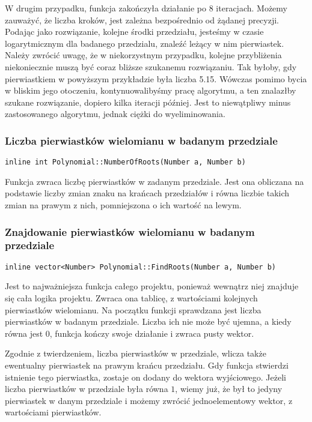 \documentclass[twoside,a4paper]{book}
\begin{document}
W drugim przypadku, funkcja zakończyła działanie po 8 iteracjach. Możemy zauważyć, że liczba kroków, jest zależna bezpośrednio od żądanej precyzji. Podając jako rozwiązanie, kolejne środki przedziału, jesteśmy w czasie logarytmicznym dla badanego przedzialu, znaleźć leżący w nim pierwiastek. Należy zwrócić uwagę, że w niekorzystnym przypadku, kolejne przybliżenia niekoniecznie muszą być coraz bliższe szukanemu rozwiązaniu. Tak byłoby, gdy pierwiastkiem w powyższym przykładzie była liczba 5.15. Wówczas pomimo bycia w bliskim jego otoczeniu, kontynuowalibyśmy pracę algorytmu, a ten znalazłby szukane rozwiązanie, dopiero kilka iteracji później. Jest to niewątpliwy minus zastosowanego algorytmu, jednak ciężki do wyeliminowania.
\\

\subsubsection{Liczba pierwiastków wielomianu w badanym przedziale}
\begin{lstlisting}
inline int Polynomial::NumberOfRoots(Number a, Number b)
\end{lstlisting}

Funkcja zwraca liczbę pierwiastków w zadanym przedziale. Jest ona obliczana na podstawie liczby zmian znaku na krańcach przedziałów i równa liczbie takich zmian na prawym z nich, pomniejszona o ich wartość na lewym.
\\

\subsubsection{Znajdowanie pierwiastków wielomianu w badanym przedziale}
\begin{lstlisting}
inline vector<Number> Polynomial::FindRoots(Number a, Number b)
\end{lstlisting}

Jest to najważniejsza funkcja całego projektu, ponieważ wewnątrz niej znajduje się cała logika projektu. Zwraca ona tablicę, z wartościami kolejnych pierwiastków wielomianu. Na początku funkcji sprawdzana jest liczba pierwiastków w badanym przedziale. Liczba ich nie może być ujemna, a kiedy równa jest $0$, funkcja kończy swoje działanie i zwraca pusty wektor.

Zgodnie z twierdzeniem, liczba pierwiastków w przedziale, wlicza także ewentualny pierwiastek na prawym krańcu przedziału. Gdy funkcja stwierdzi istnienie tego pierwiastka, zostaje on dodany do wektora wyjściowego. Jeżeli liczba pierwiastków w przedziale była równa $1$, wiemy już, że był to jedyny pierwiastek w danym przedziale i możemy zwrócić jednoelementowy wektor, z wartościami pierwiastków.
\end{document}
